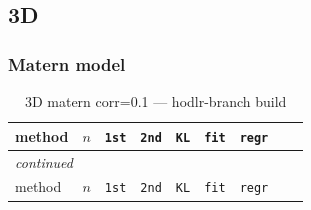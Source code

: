 \documentclass[11pt,a4paper]{article}
\begin{document}
\subsection{3D}
\subsubsection*{Matern model}
\begin{center}
\begin{longtable}{llrcccccc}
\caption{3D matern corr=0.1 --- hodlr-branch build}
\\\toprule
method & $n$ & \texttt{1st} & \texttt{2nd} & \texttt{KL} & \texttt{fit} & \texttt{regr}\\
\midrule
\endfirsthead
\multicolumn{8}{l}{\small\emph{continued}}\\
\toprule
method & $n$ & \texttt{1st} & \texttt{2nd} & \texttt{KL} & \texttt{fit} & \texttt{regr}\\
\midrule
\endhead


\end{longtable}
\end{center}
\end{document}
